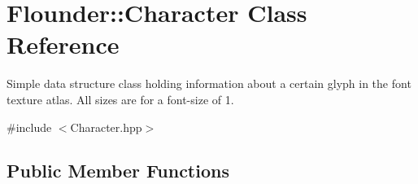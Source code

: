 \hypertarget{class_flounder_1_1_character}{}\section{Flounder\+:\+:Character Class Reference}
\label{class_flounder_1_1_character}


Simple data structure class holding information about a certain glyph in the font texture atlas. All sizes are for a font-\/size of 1.  




{\ttfamily \#include $<$Character.\+hpp$>$}

\subsection*{Public Member Functions}
